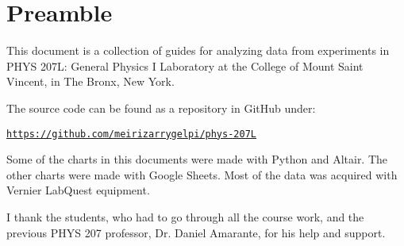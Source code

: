 \chapter*{Preamble}
%
This document is a collection of guides for analyzing data from experiments in PHYS 207L: General Physics I Laboratory at the College of Mount Saint Vincent, in The Bronx, New York.

The source code can be found as a repository in GitHub under:
\begin{center}
    \href{https://github.com/meirizarrygelpi/phys-207L}{\texttt{https://github.com/meirizarrygelpi/phys-207L}}
\end{center}
Some of the charts in this documents were made with Python and Altair. The other charts were made with Google Sheets. Most of the data was acquired with Vernier LabQuest equipment.

I thank the students, who had to go through all the course work, and the previous PHYS 207 professor, Dr. Daniel Amarante, for his help and support.
